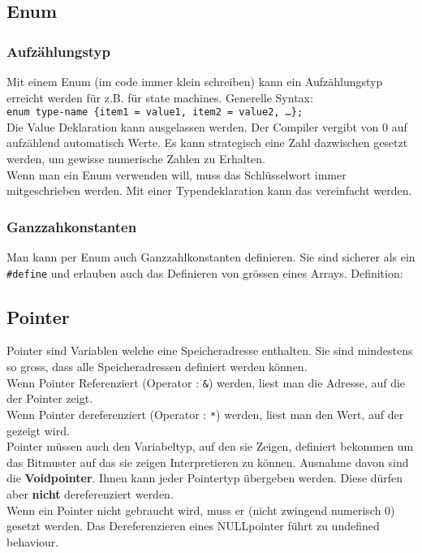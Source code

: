 \subsection{Enum}

\subsubsection{Aufzählungstyp}

Mit einem Enum (im code immer klein schreiben) kann ein Aufzählungstyp erreicht werden für z.B. für state machines. Generelle Syntax:\\
\verb|enum type-name {item1 = value1, item2 = value2, …};|\\
Die Value Deklaration kann ausgelassen werden. 
Der Compiler vergibt von 0 auf aufzählend automatisch Werte. 
Es kann strategisch eine Zahl dazwischen gesetzt werden, um gewisse numerische Zahlen zu Erhalten.\\
Wenn man ein Enum verwenden will, muss das Schlüsselwort  immer mitgeschrieben werden. 
Mit einer Typendeklaration kann das vereinfacht werden. 



\nextcol

\subsubsection{Ganzzahkonstanten}

Man kann per Enum auch Ganzzahlkonstanten definieren. Sie sind sicherer als ein \verb|#define| und erlauben auch das Definieren von grössen eines Arrays. 
Definition:



\subsection{Pointer}\label{Pointerbasics}

Pointer sind Variablen welche eine Speicheradresse enthalten. 
Sie sind mindestens so gross, dass alle Speicheradressen definiert werden können.\\
Wenn Pointer Referenziert (Operator : \verb|&|) werden, liest man die Adresse, auf die der Pointer zeigt.\\
Wenn Pointer dereferenziert (Operator : \verb|*|) werden, liest man den Wert, auf der gezeigt wird.\\ 
Pointer müssen auch den Variabeltyp, auf den sie Zeigen, definiert bekommen um das Bitmuster auf das sie zeigen Interpretieren zu können. 
Ausnahme davon sind die \textbf{Voidpointer}. 
Ihnen kann jeder Pointertyp übergeben werden. 
Diese dürfen aber \textbf{nicht} dereferenziert werden.\\
Wenn ein Pointer nicht gebraucht wird, muss er  (nicht zwingend numerisch 0) gesetzt werden. 
Das Dereferenzieren eines NULLpointer  führt zu undefined behaviour.\\

